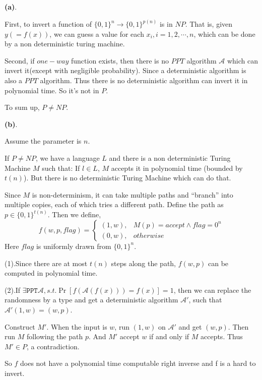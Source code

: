 \documentclass[a4paper]{article}
\newcommand{\A}{\mathcal{A}}
\newenvironment{problem}[2][Problem]{\begin{trivlist}
\item[\hskip \labelsep {\bfseries #1}\hskip \labelsep {\bfseries #2.}]}{\end{trivlist}}
\begin{document}
\begin{problem}{7.11}
\textbf{(a)}.\par
First, to invert a function of $\{0,1\}^n\rightarrow\{0,1\}^{p(n)}$ is in $NP$. That is, given $y(=f(x))$, we can guess a value for each $x_i,i=1,2,\cdots,n$, which can be done by a non deterministic turing machine.\par
Second, if $one-way$ function exists, then there is no $PPT$ algorithm $\A$ which can invert it(except with negligible probability). Since a deterministic algorithm is also a $PPT$ algorithm. Thus there is no deterministic algorithm can invert it in polynomial time. So it's not in $P$.\par
To sum up, $P\ne NP$.\par\vspace{3ex}
\textbf{(b)}.\par
Assume the parameter is $n$.\par
If $P\ne NP$, we have a language $L$ and there is a non deterministic
Turing Machine $M$ such that: If $l\in L$, $M$ accepts it in polynomial time (bounded by $t(n)$). But there is no deterministic Turing Machine which can do that.\par
Since $M$ is non-determinism, it can take multiple paths and “branch” into multiple copies, each of which tries a different path. Define the path as $p\in\{0,1\}^{t(n)}$. Then we define,
		\begin{equation*}  
			f(w,p,flag)= \begin{cases}
					(1,w), & M(p)=accept\land flag=0^n \\  
					(0,w), & otherwise
				\end{cases} 
		\end{equation*}
		Here $flag$ is uniformly drawn from $\{0,1\}^n$.\par
(1).Since there are at most $t(n)$ steps along the path, $f(w,p)$ can be computed in polynomial time.\par
(2).If $\exists\texttt{PPT}\A, s.t.\Pr[f(\A(f(x)))=f(x)]=1$, then we can replace the randomness by a type and get a deterministic algorithm $\A'$, such that $\A'(1,w)=(w,p)$. \par
Construct $M'$. When the input is $w$, run $(1,w)$ on $\A'$ and get $(w,p)$. Then run $M$ following the path $p$. And $M'$ accept $w$ if and only if $M$ accepts. Thus $M'\in P$, a contradiction.\par
So $f$ does not have a polynomial time
computable right inverse and f is a hard to invert.\par

\end{problem}
\end{document}

